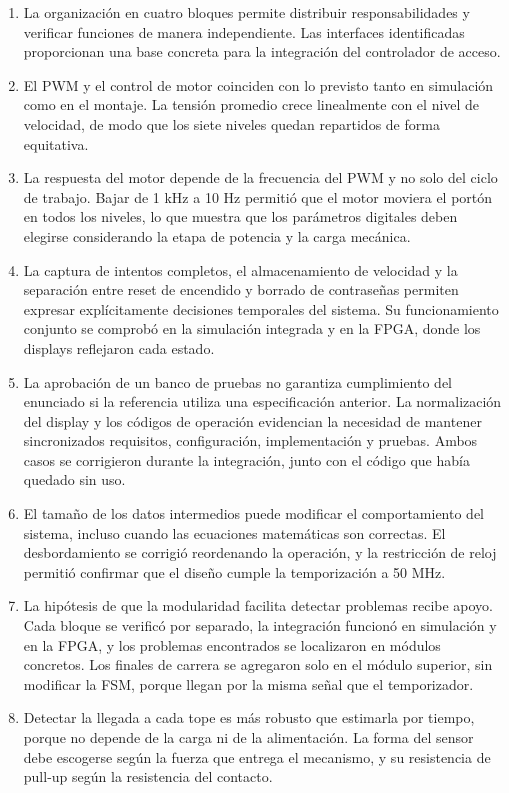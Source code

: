 \documentclass[12pt,letterpaper]{article}
\begin{document}
\begin{enumerate}
    \item La organización en cuatro bloques permite
    distribuir responsabilidades y verificar funciones
    de manera independiente. Las interfaces identificadas
    proporcionan una base concreta para la integración
    del controlador de acceso.

    \item El PWM y el control de motor coinciden con lo
    previsto tanto en simulación como en el montaje. La
    tensión promedio crece linealmente con el nivel de
    velocidad, de modo que los siete niveles quedan
    repartidos de forma equitativa.

    \item La respuesta del motor depende de la frecuencia
    del PWM y no solo del ciclo de trabajo. Bajar de 1 kHz
    a 10 Hz permitió que el motor moviera el portón en
    todos los niveles, lo que muestra que los parámetros
    digitales deben elegirse considerando la etapa de
    potencia y la carga mecánica.

    \item La captura de intentos completos, el
    almacenamiento de velocidad y la separación entre
    reset de encendido y borrado de contraseñas permiten
    expresar explícitamente decisiones temporales del
    sistema. Su funcionamiento conjunto se comprobó en la
    simulación integrada y en la FPGA, donde los displays
    reflejaron cada estado.

    \item La aprobación de un banco de pruebas no
    garantiza cumplimiento del enunciado si la referencia
    utiliza una especificación anterior. La normalización
    del display y los códigos de operación evidencian la
    necesidad de mantener sincronizados requisitos,
    configuración, implementación y pruebas. Ambos casos
    se corrigieron durante la integración, junto con el
    código que había quedado sin uso.

    \item El tamaño de los datos intermedios puede
    modificar el comportamiento del sistema, incluso
    cuando las ecuaciones matemáticas son correctas. El
    desbordamiento se corrigió reordenando la operación, y
    la restricción de reloj permitió confirmar que el
    diseño cumple la temporización a 50 MHz.

    \item La hipótesis de que la modularidad facilita
    detectar problemas recibe apoyo. Cada bloque se
    verificó por separado, la integración funcionó en
    simulación y en la FPGA, y los problemas encontrados
    se localizaron en módulos concretos. Los finales de
    carrera se agregaron solo en el módulo superior, sin
    modificar la FSM, porque llegan por la misma señal que
    el temporizador.

    \item Detectar la llegada a cada tope es más robusto
    que estimarla por tiempo, porque no depende de la carga
    ni de la alimentación. La forma del sensor debe
    escogerse según la fuerza que entrega el mecanismo, y
    su resistencia de pull-up según la resistencia del
    contacto.
\end{enumerate}
\end{document}
